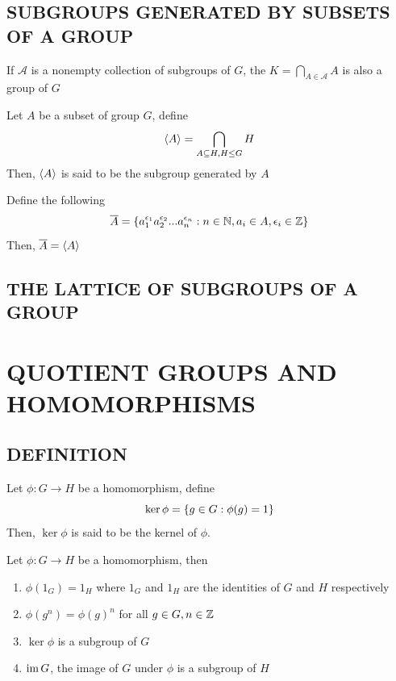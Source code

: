 \subsection{SUBGROUPS GENERATED BY SUBSETS OF A GROUP}

\begin{proposition}
	If $\mathcal{A}$ is a nonempty collection of subgroups of $G$, the $K = \bigcap_{A \in \mathcal{A}} A$ is also a group of $G$
\end{proposition}

\begin{definition}
	Let $A$ be a subset of group $G$, define
	\[
	\langle A\rangle = \bigcap_{A \subseteq H, H \leq G} H
	\]
	Then, $\langle A\rangle$ is said to be the subgroup generated by $A$
\end{definition}

\begin{proposition}
	Define the following
	\[
	\overline{A} = \{ a_1^{\epsilon_1} a_2^{\epsilon_2} ... a_n^{\epsilon_n}: n \in \mathbb{N}, a_i \in A, \epsilon_i \in \mathbb{Z}\}
	\]
	Then, $\overline{A} = \langle A\rangle$
\end{proposition}

\subsection{THE LATTICE OF SUBGROUPS OF A GROUP}

\section{QUOTIENT GROUPS AND HOMOMORPHISMS}

\subsection{DEFINITION}

\begin{definition}
	Let $\phi: G \to H$ be a homomorphism, define
	\[
	\ker \phi = \{g \in G: \phi(g) = 1\}
	\]
	Then, $\ker \phi$ is said to be the kernel of $\phi$.
\end{definition}

\begin{proposition}
	Let $\phi: G \to H$ be a homomorphism, then
	\begin{enumerate}
		\item $\phi(1_G) = 1_H$ where $1_G$ and $1_H$ are the identities of $G$ and $H$ respectively
		\item $\phi(g^n) = \phi(g)^n$ for all $g \in G, n \in \mathbb{Z}$
		\item $\ker \phi$ is a subgroup of $G$
		\item $\operatorname{im} G$, the image of $G$ under $\phi$ is a subgroup of $H$
	\end{enumerate}
\end{proposition}

